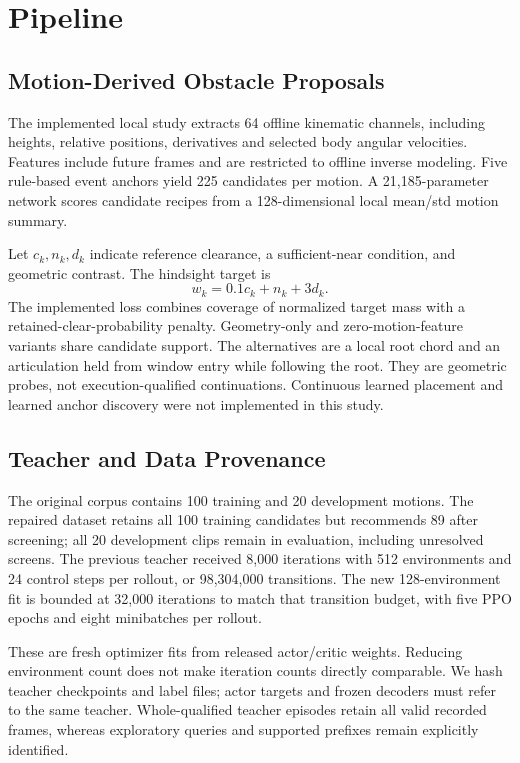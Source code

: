 \documentclass[10pt,twocolumn]{article}
\begin{document}
\section{Pipeline}
\subsection{Motion-Derived Obstacle Proposals}
The implemented local study extracts 64 offline kinematic channels, including heights, relative positions, derivatives and selected body angular velocities. Features include future frames and are restricted to offline inverse modeling. Five rule-based event anchors yield 225 candidates per motion. A 21,185-parameter network scores candidate recipes from a 128-dimensional local mean/std motion summary.

Let $c_k,n_k,d_k$ indicate reference clearance, a sufficient-near condition, and geometric contrast. The hindsight target is
\begin{equation}
 w_k=0.1c_k+n_k+3d_k.
\end{equation}
The implemented loss combines coverage of normalized target mass with a retained-clear-probability penalty. Geometry-only and zero-motion-feature variants share candidate support. The alternatives are a local root chord and an articulation held from window entry while following the root. They are geometric probes, not execution-qualified continuations. Continuous learned placement and learned anchor discovery were not implemented in this study.

\subsection{Teacher and Data Provenance}
The original corpus contains 100 training and 20 development motions. The repaired dataset retains all 100 training candidates but recommends 89 after screening; all 20 development clips remain in evaluation, including unresolved screens. The previous teacher received 8,000 iterations with 512 environments and 24 control steps per rollout, or 98,304,000 transitions. The new 128-environment fit is bounded at 32,000 iterations to match that transition budget, with five PPO epochs and eight minibatches per rollout.

These are fresh optimizer fits from released actor/critic weights. Reducing environment count does not make iteration counts directly comparable. We hash teacher checkpoints and label files; actor targets and frozen decoders must refer to the same teacher. Whole-qualified teacher episodes retain all valid recorded frames, whereas exploratory queries and supported prefixes remain explicitly identified.
\end{document}
